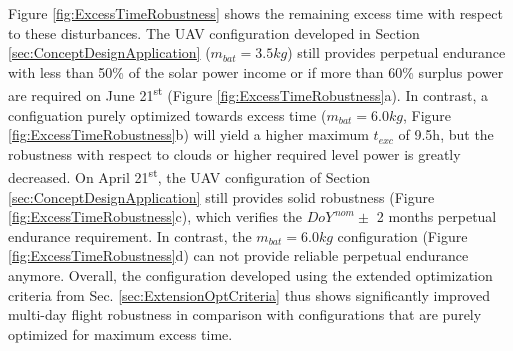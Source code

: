 Figure \ref{fig:ExcessTimeRobustness} shows the remaining excess time with respect to these disturbances. The UAV configuration developed in Section \ref{sec:ConceptDesignApplication} ($m_{bat}=3.5kg$) still provides perpetual endurance with less than 50\% of the solar power income or if more than 60\% surplus power are required on June 21\textsuperscript{st} (Figure \ref{fig:ExcessTimeRobustness}a). In contrast, a configuation purely optimized towards excess time ($m_{bat}=6.0kg$, Figure \ref{fig:ExcessTimeRobustness}b) will yield a higher maximum $t_{exc}$ of 9.5h, but the robustness with respect to clouds or higher required level power is greatly decreased. On April  21\textsuperscript{st}, the UAV configuration of Section \ref{sec:ConceptDesignApplication} still provides solid robustness (Figure \ref{fig:ExcessTimeRobustness}c), which verifies the $DoY^{\,nom}\pm$ 2 months perpetual endurance requirement. In contrast, the $m_{bat}=6.0kg$ configuration (Figure \ref{fig:ExcessTimeRobustness}d) can not provide reliable perpetual endurance anymore. Overall, the configuration developed using the extended optimization criteria from Sec. \ref{sec:ExtensionOptCriteria} thus shows significantly improved multi-day flight robustness in comparison with configurations that are purely optimized for maximum excess time.